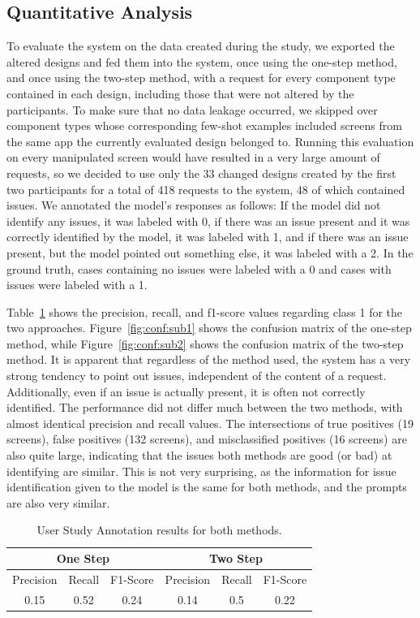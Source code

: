 \documentclass[11pt,titlepage,oneside,openany]{book}
\begin{document}
\subsection{Quantitative Analysis}\label{sec:quant}

To evaluate the system on the data created during the study, we exported the altered designs and fed them into the system, once using the one-step method, and once using the two-step method, with a request for every component type contained in each design, including those that were not altered by the participants. To make sure that no data leakage occurred, we skipped over component types whose corresponding few-shot examples included screens from the same app the currently evaluated design belonged to. Running this evaluation on every manipulated screen would have resulted in a very large amount of requests, so we decided to use only the 33 changed designs created by the first two participants for a total of 418 requests to the system, 48 of which contained issues. We annotated the model's responses as follows: If the model did not identify any issues, it was labeled with 0, if there was an issue present and it was correctly identified by the model, it was labeled with 1, and if there was an issue present, but the model pointed out something else, it was labeled with a 2. In the ground truth, cases containing no issues were labeled with a 0 and cases with issues were labeled with a 1.

Table~\ref{tab:userstudy} shows the precision, recall, and f1-score values regarding class 1 for the two approaches. Figure~\ref{fig:conf:sub1} shows the confusion matrix of the one-step method, while Figure~\ref{fig:conf:sub2} shows the confusion matrix of the two-step method. It is apparent that regardless of the method used, the system has a very strong tendency to point out issues, independent of the content of a request. Additionally, even if an issue is actually present, it is often not correctly identified. The performance did not differ much between the two methods, with almost identical precision and recall values. The intersections of true positives (19 screens), false positives (132 screens), and misclassified positives (16 screens) are also quite large, indicating that the issues both methods are good (or bad) at identifying are similar. This is not very surprising, as the information for issue identification given to the model is the same for both methods, and the prompts are also very similar.

\begin{table}
	\begin{center}
		\begin{tabular}{|ccc|ccc|}
			\hline
			\multicolumn{3}{|c|}{One Step} & \multicolumn{3}{c|}{Two Step} \\ \hline
			Precision  & Recall & F1-Score & Precision & Recall & F1-Score \\ \hline
			0.15       & 0.52   & 0.24     & 0.14      & 0.5   & 0.22     \\ \hline
		\end{tabular}
		\caption{User Study Annotation results for both methods.}
		\label{tab:userstudy}
	\end{center}
\end{table}
\end{document}
